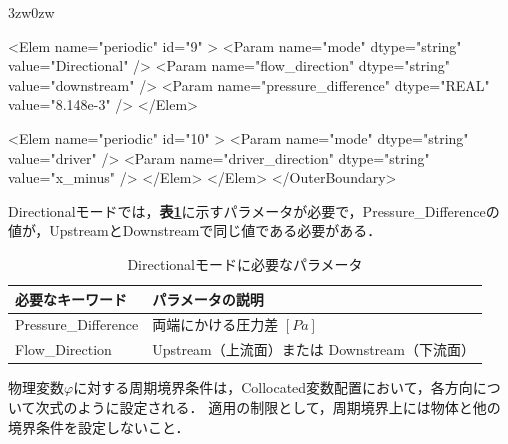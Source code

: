 \begin{indentation}{3zw}{0zw}
{\begin{program}
    <Elem name="periodic" id="9" >
      <Param name="mode"                dtype="string" value="Directional" />
      <Param name="flow_direction"      dtype="string" value="downstream" />
      <Param name="pressure_difference" dtype="REAL"   value="8.148e-3" />
    </Elem>
      
    <Elem name="periodic" id="10" >
      <Param name="mode"             dtype="string" value="driver" />
      <Param name="driver_direction" dtype="string" value="x_minus" />
    </Elem>
  </Elem>
</OuterBoundary>
\end{program}
}


Directionalモードでは，\textbf{表\ref{tbl:parameter dir. mode}}に示すパラメータが必要で，Pressure\_Differenceの値が，UpstreamとDownstreamで同じ値である必要がある．

\begin{table}[htdp]
\caption{Directionalモードに必要なパラメータ}
\begin{center}
\small
\begin{tabular}{ll} \toprule
必要なキーワード & パラメータの説明\\ \midrule
Pressure\_Difference & 両端にかける圧力差 $[Pa]$\\
Flow\_Direction & Upstream（上流面）または Downstream（下流面）\\
\bottomrule
\end{tabular}
\end{center}
\label{tbl:parameter dir. mode}
\end{table}


物理変数$\varphi$に対する周期境界条件は，Collocated変数配置において，各方向について次式のように設定される．
適用の制限として，周期境界上には物体と他の境界条件を設定しないこと．


\end{indentation}
